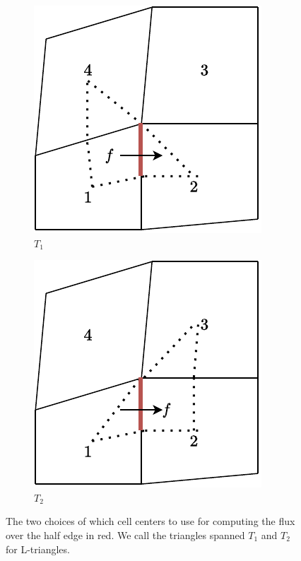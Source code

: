 \documentclass[../Main/main.tex]{subfiles}
\begin{document}
	\begin{figure}[H]
		\centering
		\begin{subfigure}[b]{0.4\textwidth}
			\centering
			\includegraphics[width=\textwidth]{left choice.pdf}
			\caption{$T_1$}
		\end{subfigure}
		\hfill
		\begin{subfigure}[b]{0.4\textwidth}
			\centering
			\includegraphics[width=\textwidth]{right choice.pdf}
			\caption{$T_2$}
			\label{fig:three sin x}
		\end{subfigure}
		\caption{The two choices of which cell centers to use for computing the flux over the half edge in red. We call the triangles spanned $T_1$ and $T_2$ for L-triangles.}
		\label{fig:two choices}
	\end{figure}
\end{document}
